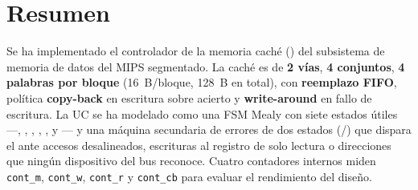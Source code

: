\section{Resumen}
\label{sec:resumen}

Se ha implementado el controlador de la memoria cach\'e () del subsistema de
memoria de datos del MIPS segmentado. La cach\'e es de \textbf{2 v\'ias}, \textbf{4 conjuntos},
\textbf{4 palabras por bloque} (16~B/bloque, 128~B en total), con
\textbf{reemplazo FIFO}, pol\'itica \textbf{copy-back} en escritura sobre acierto y
\textbf{write-around} en fallo de escritura. La UC se ha modelado como una FSM Mealy con
siete estados \'utiles ---, , ,
, ,  y --- y una
m\'aquina secundaria de errores de dos estados (/)
que dispara el  ante accesos desalineados, escrituras al registro de
solo lectura o direcciones que ning\'un dispositivo del bus reconoce. Cuatro contadores
internos miden \texttt{cont\_m}, \texttt{cont\_w}, \texttt{cont\_r} y \texttt{cont\_cb}
para evaluar el rendimiento del dise\~no.
